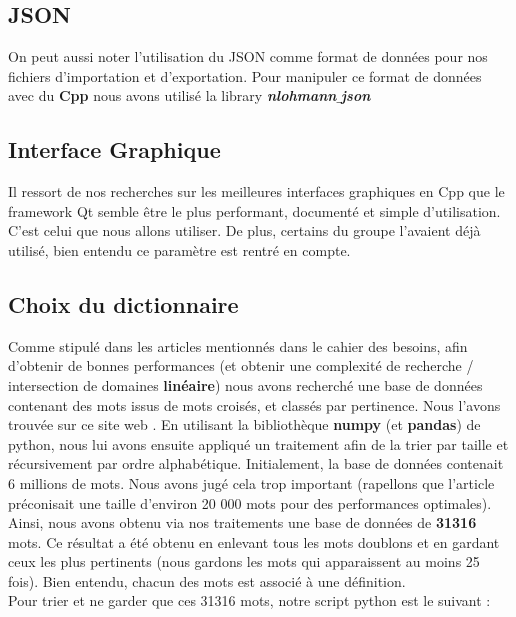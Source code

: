 \documentclass [ 11 pt ] {article}
\begin{document}
    \subsection{JSON}
    On peut aussi noter l'utilisation du JSON comme format de données pour nos fichiers d'importation et d'exportation. Pour manipuler ce format de données avec du \textbf{Cpp} nous avons utilisé la library \textbf{\textit{nlohmann$\_$json}} \cite{NJs}
    \subsection{Interface Graphique}
    Il ressort de nos recherches sur les meilleures interfaces graphiques en Cpp que le framework Qt \cite{QtD} semble être le plus performant, documenté et simple d'utilisation. C'est celui que nous allons utiliser. De plus, certains du groupe l'avaient déjà utilisé, bien entendu ce paramètre est rentré en compte. 
    
    \subsection{Choix du dictionnaire}
    Comme stipulé dans les articles mentionnés dans le cahier des besoins, afin d'obtenir de bonnes performances (et obtenir une complexité de recherche / intersection de domaines \textbf{linéaire}) nous avons recherché une base de données contenant des mots issus de mots croisés, et classés par pertinence. Nous l'avons trouvée sur ce site web \cite{Bd} . En utilisant la bibliothèque \textbf{numpy} (et \textbf{pandas}) de python, nous lui avons ensuite appliqué un traitement afin de la trier par taille et récursivement par ordre alphabétique. Initialement, la base de données contenait 6 millions de mots. Nous avons jugé cela trop important (rapellons que l'article \cite{CpC} préconisait une taille d'environ 20 000 mots pour des performances optimales). Ainsi, nous avons obtenu via nos traitements une base de données de \textbf{31316} mots. Ce résultat a été obtenu en enlevant tous les mots doublons et en gardant ceux les plus pertinents (nous gardons les mots qui apparaissent au moins 25 fois). Bien entendu, chacun des mots est associé à une définition. \\
    
    Pour trier et ne garder que ces 31316 mots, notre script python est le suivant : 
    
\end{document}
